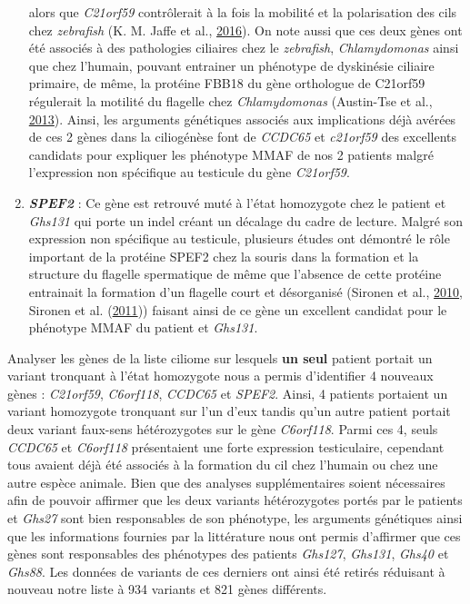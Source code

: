 \documentclass[12pt,twoside]{reedthesis}
\theoremstyle{definition}
\theoremstyle{definition}
\theoremstyle{remark}
\begin{document}
\begin{enumerate}
    alors que \emph{C21orf59} contrôlerait à la fois la mobilité et la
    polarisation des cils chez \emph{zebrafish} (K. M. Jaffe et al.,
    \protect\hyperlink{ref-Jaffe2016}{2016}). On note aussi que ces deux
    gènes ont été associés à des pathologies ciliaires chez le
    \emph{zebrafish}, \emph{Chlamydomonas} ainsi que chez l'humain,
    pouvant entrainer un phénotype de dyskinésie ciliaire primaire, de
    même, la protéine FBB18 du gène orthologue de C21orf59 régulerait la
    motilité du flagelle chez \emph{Chlamydomonas} (Austin-Tse et al.,
    \protect\hyperlink{ref-Austin-Tse2013}{2013}). Ainsi, les arguments
    génétiques associés aux implications déjà avérées de ces 2 gènes dans
    la ciliogénèse font de \emph{CCDC65} et \emph{c21orf59} des excellents
    candidats pour expliquer les phénotype MMAF de nos 2 patients malgré
    l'expression non spécifique au testicule du gène \emph{C21orf59}.
  \item
    \textbf{\emph{SPEF2}} : Ce gène est retrouvé muté à l'état homozygote
    chez le patient et \emph{Ghs131} qui porte un indel créant un décalage
    du cadre de lecture. Malgré son expression non spécifique au
    testicule, plusieurs études ont démontré le rôle important de la
    protéine SPEF2 chez la souris dans la formation et la structure du
    flagelle spermatique de même que l'absence de cette protéine
    entrainait la formation d'un flagelle court et désorganisé (Sironen et
    al., \protect\hyperlink{ref-Sironen2010}{2010}, Sironen et al.
    (\protect\hyperlink{ref-Sironen2011}{2011})) faisant ainsi de ce gène
    un excellent candidat pour le phénotype MMAF du patient et
    \emph{Ghs131}.
  \end{enumerate}
  
  Analyser les gènes de la liste ciliome sur lesquels \textbf{un seul}
  patient portait un variant tronquant à l'état homozygote nous a permis
  d'identifier 4 nouveaux gènes : \emph{C21orf59}, \emph{C6orf118},
  \emph{CCDC65} et \emph{SPEF2}. Ainsi, 4 patients portaient un variant
  homozygote tronquant sur l'un d'eux tandis qu'un autre patient portait
  deux variant faux-sens hétérozygotes sur le gène \emph{C6orf118}. Parmi
  ces 4, seuls \emph{CCDC65} et \emph{C6orf118} présentaient une forte
  expression testiculaire, cependant tous avaient déjà été associés à la
  formation du cil chez l'humain ou chez une autre espèce animale. Bien
  que des analyses supplémentaires soient nécessaires afin de pouvoir
  affirmer que les deux variants hétérozygotes portés par le patients et
  \emph{Ghs27} sont bien responsables de son phénotype, les arguments
  génétiques ainsi que les informations fournies par la littérature nous
  ont permis d'affirmer que ces gènes sont responsables des phénotypes des
  patients \emph{Ghs127}, \emph{Ghs131}, \emph{Ghs40} et \emph{Ghs88}. Les
  données de variants de ces derniers ont ainsi été retirés réduisant à
  nouveau notre liste à 934 variants et 821 gènes différents.
  
\end{document}
